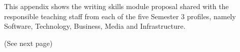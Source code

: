 This appendix shows the writing skills module proposal shared with the responsible teaching staff from each of the five Semester 3 profiles, namely Software, Technology, Business, Media and Infrastructure.

\null\hfill (See next page)
 


